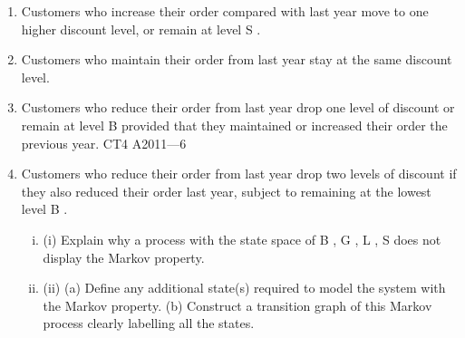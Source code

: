 \documentclass[a4paper,12pt]{article}
\begin{document}
\begin{enumerate}[1]
[Total 14]
Farmer Giles makes hay each year and he makes far more than he could possibly store
and use himself, but he does not always sell it all. He has decided to offer incentives
for people to buy large quantities so it does not sit in his field deteriorating. He has
devised the following “discount” scheme.
He has a Base price, B of £8 per bale. Then he has three levels of discount: Good
price, G , is a 10%
25%
\item Customers who increase their order compared with last year move to one higher
discount level, or remain at level S .
\item Customers who maintain their order from last year stay at the same discount level.
\item Customers who reduce their order from last year drop one level of discount or
remain at level B provided that they maintained or increased their order the
previous year.
CT4 A2011—6\item
Customers who reduce their order from last year drop two levels of discount if
they also reduced their order last year, subject to remaining at the lowest level B .
\begin{enumerate}[(i)]
\item (i) Explain why a process with the state space of { B , G , L , S } does not display the
Markov property.
\item 
(ii) (a)
Define any additional state(s) required to model the system
with the Markov property.
(b)
Construct a transition graph of this Markov process clearly labelling
all the states.


\end{enumerate}
\end{enumerate}
\end{document}
